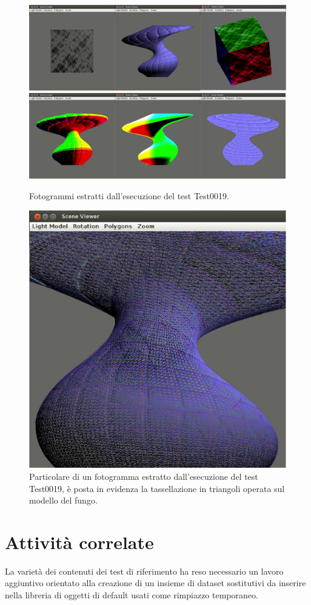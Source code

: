 \begin{figure}%
\begin{center}
\includegraphics[width=\textwidth]{Immagini/test0019/test0019-wall1}
\includegraphics[width=\textwidth]{Immagini/test0019/test0019-wall2}
\caption{Fotogrammi estratti dall'esecuzione del test Test0019. \label{f:test0019-wall}} 
\end{center} 
\end{figure}



\begin{figure}%
\begin{center}
\includegraphics[width=\textwidth]{Immagini/test0019/test0019-tessel}
\caption{Particolare di un fotogramma estratto dall'esecuzione del test Test0019, \`e posta in evidenza la tassellazione in triangoli operata sul modello del fungo. \label{f:test0019-tessel}} 
\end{center} 
\end{figure}

\section{Attivit\`a correlate}
\label{sec:correlate}
La variet\`a dei contenuti dei test di riferimento ha reso necessario un lavoro aggiuntivo orientato alla creazione di un insieme di dataset sostitutivi da inserire nella libreria di oggetti di default usati come rimpiazzo temporaneo.


